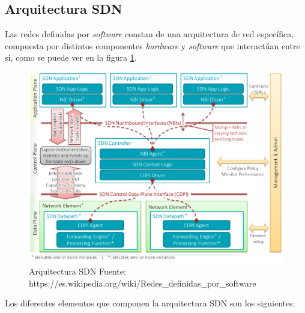 \subsection{Arquitectura SDN}

Las redes definidas por \textit{software} constan de una arquitectura de red específica, compuesta por distintos componentes \textit{hardware} y \textit{software} que interactúan entre sí, como se puede ver en la figura \ref{fig:arquitecturasdn}.
 
\begin{figure}[!ht]
	\centering
	\includegraphics[width=0.75\linewidth]{imagenes/arquitectura_sdn}
	\caption{Arquitectura SDN  Fuente: https://es.wikipedia.org/wiki/Redes\_definidas\_por\_software}
	\label{fig:arquitecturasdn}
\end{figure}

Los diferentes elementos que componen la arquitectura SDN son los siguientes:

